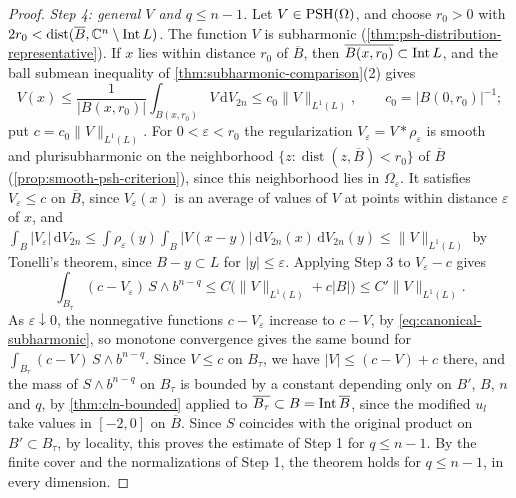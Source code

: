 \begin{proof}
\emph{Step 4: general $V$ and $q\le n-1$.} Let $V\in\mathrm{PSH}(\Omega)$, and choose $r_0>0$ with $2r_0<\operatorname{dist}(\overline B,\mathbb C^n\setminus\operatorname{Int} L)$. The function $V$ is subharmonic (\cref{thm:psh-distribution-representative}). If $x$ lies within distance $r_0$ of $\overline B$, then $\overline{B(x,r_0)}\subset\operatorname{Int} L$, and the ball submean inequality of \cref{thm:subharmonic-comparison}(2) gives
\[
 V(x)\le\frac1{|B(x,r_0)|}\int_{B(x,r_0)}V\,\mathrm dV_{2n}\le c_0\|V\|_{L^1(L)},\qquad c_0=|B(0,r_0)|^{-1};
\]
put $c=c_0\|V\|_{L^1(L)}$. For $0<\varepsilon<r_0$ the regularization $V_\varepsilon=V*\rho_\varepsilon$ is smooth and plurisubharmonic on the neighborhood $\{z:\operatorname{dist}(z,\overline B)<r_0\}$ of $\overline B$ (\cref{prop:smooth-psh-criterion}), since this neighborhood lies in $\Omega_\varepsilon$. It satisfies $V_\varepsilon\le c$ on $\overline B$, since $V_\varepsilon(x)$ is an average of values of $V$ at points within distance $\varepsilon$ of $x$, and $\int_B|V_\varepsilon|\,\mathrm{d}V_{2n}\le\int\rho_\varepsilon(y)\int_B|V(x-y)|\,\mathrm dV_{2n}(x)\,\mathrm dV_{2n}(y)\le\|V\|_{L^1(L)}$ by Tonelli's theorem, since $B-y\subset L$ for $|y|\le\varepsilon$. Applying Step 3 to $V_\varepsilon-c$ gives
\[
 \int_{B_\tau}(c-V_\varepsilon)\,S\wedge b^{n-q}\le C\bigl(\|V\|_{L^1(L)}+c|B|\bigr)\le C'\|V\|_{L^1(L)}.
\]
As $\varepsilon\downarrow0$, the nonnegative functions $c-V_\varepsilon$ increase to $c-V$, by \eqref{eq:canonical-subharmonic}, so monotone convergence gives the same bound for $\int_{B_\tau}(c-V)\,S\wedge b^{n-q}$. Since $V\le c$ on $B_\tau$, we have $|V|\le(c-V)+c$ there, and the mass of $S\wedge b^{n-q}$ on $B_\tau$ is bounded by a constant depending only on $B'$, $B$, $n$ and $q$, by \cref{thm:cln-bounded} applied to $\overline{B_\tau}\subset B=\operatorname{Int}\overline B$, since the modified $u_l$ take values in $[-2,0]$ on $\overline B$. Since $S$ coincides with the original product on $B'\subset B_\tau$, by locality, this proves the estimate of Step 1 for $q\le n-1$. By the finite cover and the normalizations of Step 1, the theorem holds for $q\le n-1$, in every dimension.


\end{proof}
